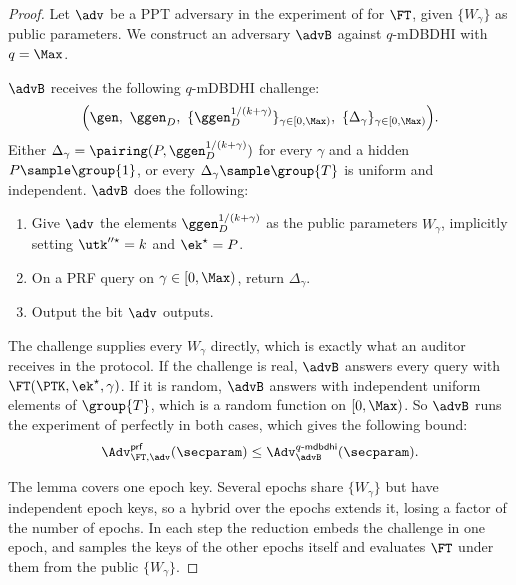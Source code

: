 \begin{proof}

  Let $\adv$ be a PPT adversary in the experiment of  for $\FT$,
given $\{W_\gamma\}$ as public parameters. We construct an adversary $\advB$
against $q$-mDBDHI with $q = \Max$.

  $\advB$ receives the following $q$-mDBDHI challenge:
  \begin{equation*}
    \Big(\gen, \ \ggen_D, \ \{\ggen_D^{1/(k+\gamma)}\}_{\gamma\in[0,\Max)}, \
\{\Delta_{\gamma}\}_{\gamma\in[0,\Max)}\Big).
  \end{equation*}
  Either $\Delta_{\gamma} = \pairing(P, \ggen_D^{1/(k+\gamma)})$ for every
$\gamma$ and a hidden $P \sample \group{1}$, or every $\Delta_{\gamma} \sample
\group{T}$ is uniform and independent. $\advB$ does the following:

  \begin{enumerate}

    \item Give $\adv$ the elements $\ggen_D^{1/(k+\gamma)}$ as the public
parameters $W_\gamma$, implicitly setting $\utk''^\star = k$ and $\ek^\star =
P$.

    \item On a PRF query on $\gamma \in [0,\Max)$, return $\Delta_\gamma$.

    \item Output the bit $\adv$ outputs.

  \end{enumerate}

  The challenge supplies every $W_\gamma$ directly, which is exactly what an
auditor receives in the protocol. If the challenge is real, $\advB$ answers
every query with $\FT(\PTK,\ek^\star,\gamma)$. If it is random, $\advB$ answers
with independent uniform elements of $\group{T}$, which is a random function on
$[0,\Max)$. So $\advB$ runs the experiment of \Cref{exp:prf} perfectly in both
cases, which gives the following bound:
  \begin{equation*}
    \Adv^{\mathsf{prf}}_{\FT,\adv}(\secparam) \leq
\Adv^{q\text{-}\mathsf{mdbdhi}}_{\advB}(\secparam).
  \end{equation*}

  The lemma covers one epoch key. Several epochs share $\{W_\gamma\}$ but have
independent epoch keys, so a hybrid over the epochs extends it, losing a factor
of the number of epochs. In each step the reduction embeds the challenge in one
epoch, and samples the keys of the other epochs itself and evaluates $\FT$ under
them from the public $\{W_\gamma\}$.

\end{proof}

